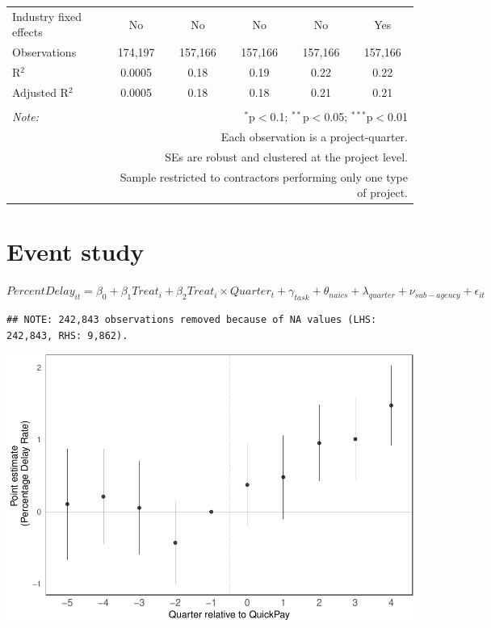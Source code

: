 \documentclass[
]{article}
\begin{document}
\begin{table}[H]
\begin{tabular}{@{\extracolsep{-2pt}}lccccc}
Industry fixed effects & No & No & No & No & Yes \\ 
Observations & 174,197 & 157,166 & 157,166 & 157,166 & 157,166 \\ 
R$^{2}$ & 0.0005 & 0.18 & 0.19 & 0.22 & 0.22 \\ 
Adjusted R$^{2}$ & 0.0005 & 0.18 & 0.18 & 0.21 & 0.21 \\ 
\hline 
\hline \\[-1.8ex] 
\textit{Note:}  & \multicolumn{5}{r}{$^{*}$p$<$0.1; $^{**}$p$<$0.05; $^{***}$p$<$0.01} \\ 
 & \multicolumn{5}{r}{Each observation is a project-quarter.} \\ 
 & \multicolumn{5}{r}{SEs are robust and clustered at the project level.} \\ 
 & \multicolumn{5}{r}{Sample restricted to contractors performing only one type of project.} \\ 
\end{tabular} 
\end{table}

\hypertarget{event-study}{%
\section{Event study}\label{event-study}}

\(PercentDelay_{it}=\beta_0 + \beta_1 Treat_i + \beta_2 Treat_i \times Quarter_t + \gamma_{task} + \theta_{naics}+\lambda_{quarter}+\nu_{sub-agency}+\epsilon_{it}\)

\begin{verbatim}
## NOTE: 242,843 observations removed because of NA values (LHS: 242,843, RHS: 9,862).
\end{verbatim}

\includegraphics{qp_first_pc_delay-2_files/figure-latex/event_study-1.pdf}
\end{document}
